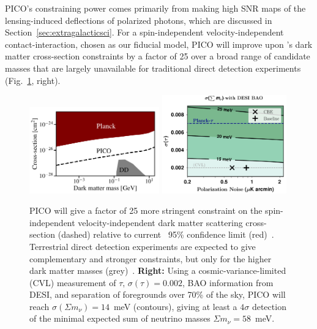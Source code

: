 \documentclass[PICOAPC.tex]{subfiles}
\begin{document}
PICO's constraining power comes primarily from making high \ac{SNR} maps of the lensing-induced deflections of polarized photons, which are discussed in Section~\ref{sec:extragalacticsci}.  For a spin-independent velocity-independent contact-interaction, chosen as our fiducial model, PICO will improve upon \planck 's dark matter cross-section constraints by a factor of 25 over a broad range of candidate masses that are largely unavailable for traditional direct detection experiments (Fig.~\ref{fig:DM_baryons}, right). 

\begin{figure}[t]
\begin{center}
\includegraphics[width=0.50\textwidth]{images/pico_dd4.pdf}
\includegraphics[width=0.48\textwidth]{images/Mnu_tauprior_final.pdf}
\vspace{-0.15in}
\caption{ PICO will give a factor of 25 more stringent constraint on the spin-independent velocity-independent dark matter scattering cross-section (dashed) relative to current \planck\ 95\% confidence limit (red)~\citep{2018PhRvL.121h1301G}. Terrestrial direct detection experiments are expected to give complementary and stronger constraints, but only for the higher dark matter masses (grey)~\cite{2018PhRvD..97l3013K}. 
{\bf Right:} Using a cosmic-variance-limited (CVL) measurement of $\tau,\, \sigma(\tau)=0.002$, \ac{BAO} information from DESI, and separation of foregrounds over 70\% of the sky, PICO will reach $\sigma(\Sigma m_{\nu}) = 14$~meV (contours), giving at least a $4\sigma$ detection of the minimal expected sum of neutrino masses $\Sigma m_{\nu} = 58$~meV. 
\label{fig:DM_baryons} }
\end{center}
\vspace{-0.2in}
\end{figure}
%
\end{document}
